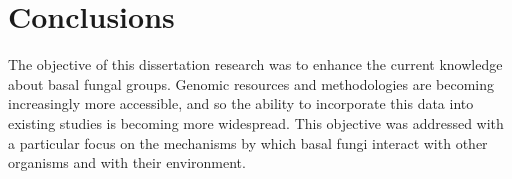 \chapter{Conclusions}
The objective of this dissertation research was to enhance the current knowledge about basal fungal groups. Genomic resources and methodologies are becoming increasingly more accessible, and so the ability to incorporate this data into existing studies is becoming more widespread. This objective was addressed with a particular focus on the mechanisms by which basal fungi interact with other organisms and with their environment. \\


